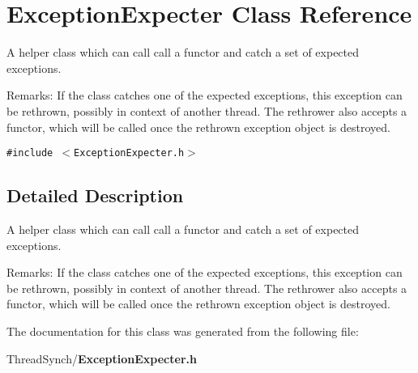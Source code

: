\section{Exception\-Expecter Class Reference}
\label{class_exception_expecter}
A helper class which can call call a functor and catch a set of expected exceptions. \begin{Desc}
\item[Remarks:]If the class catches one of the expected exceptions, this exception can be rethrown, possibly in context of another thread. The rethrower also accepts a functor, which will be called once the rethrown exception object is destroyed. \end{Desc}
 


{\tt \#include $<$Exception\-Expecter.h$>$}



\subsection{Detailed Description}
A helper class which can call call a functor and catch a set of expected exceptions. \begin{Desc}
\item[Remarks:]If the class catches one of the expected exceptions, this exception can be rethrown, possibly in context of another thread. The rethrower also accepts a functor, which will be called once the rethrown exception object is destroyed. \end{Desc}




The documentation for this class was generated from the following file:\begin{CompactItemize}
\item 
Thread\-Synch/{\bf Exception\-Expecter.h}\end{CompactItemize}
